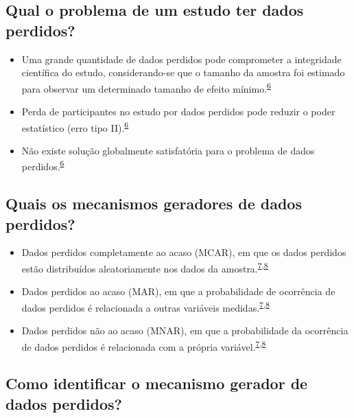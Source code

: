 \documentclass[
]{book}
\begin{document}
\hypertarget{qual-o-problema-de-um-estudo-ter-dados-perdidos}{%
\subsection{Qual o problema de um estudo ter dados perdidos?}\label{qual-o-problema-de-um-estudo-ter-dados-perdidos}}

\begin{itemize}
\item
  Uma grande quantidade de dados perdidos pode comprometer a integridade científica do estudo, considerando-se que o tamanho da amostra foi estimado para observar um determinado tamanho de efeito mínimo.\textsuperscript{\protect\hyperlink{ref-Altman2007}{6}}
\item
  Perda de participantes no estudo por dados perdidos pode reduzir o poder estatístico (erro tipo II).\textsuperscript{\protect\hyperlink{ref-Altman2007}{6}}
\item
  Não existe solução globalmente satisfatória para o problema de dados perdidos.\textsuperscript{\protect\hyperlink{ref-Altman2007}{6}}
\end{itemize}

\hypertarget{quais-os-mecanismos-geradores-de-dados-perdidos}{%
\subsection{Quais os mecanismos geradores de dados perdidos?}\label{quais-os-mecanismos-geradores-de-dados-perdidos}}

\begin{itemize}
\item
  Dados perdidos completamente ao acaso (MCAR), em que os dados perdidos estão distribuídos aleatoriamente nos dados da amostra.\textsuperscript{\protect\hyperlink{ref-Heymans2022}{7},\protect\hyperlink{ref-carpenter2021}{8}}
\item
  Dados perdidos ao acaso (MAR), em que a probabilidade de ocorrência de dados perdidos é relacionada a outras variáveis medidas.\textsuperscript{\protect\hyperlink{ref-Heymans2022}{7},\protect\hyperlink{ref-carpenter2021}{8}}
\item
  Dados perdidos não ao acaso (MNAR), em que a probabilidade da ocorrência de dados perdidos é relacionada com a própria variável.\textsuperscript{\protect\hyperlink{ref-Heymans2022}{7},\protect\hyperlink{ref-carpenter2021}{8}}
\end{itemize}

\hypertarget{como-identificar-o-mecanismo-gerador-de-dados-perdidos}{%
\subsection{Como identificar o mecanismo gerador de dados perdidos?}\label{como-identificar-o-mecanismo-gerador-de-dados-perdidos}}
\end{document}
